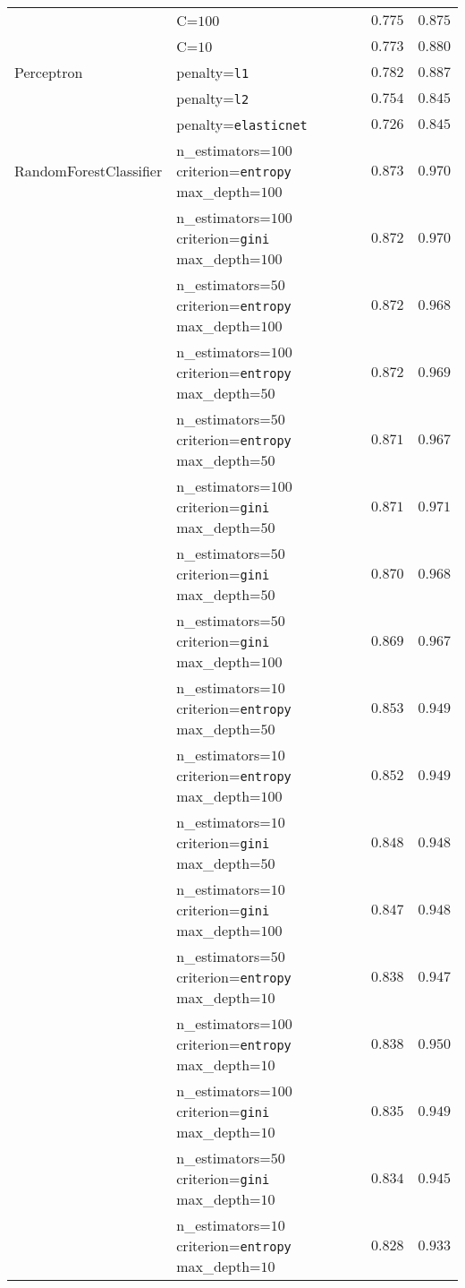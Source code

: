 \begin{longtable}{llrr}
& \tiny{C=$100$} &$0.775$ & $0.875$\\
& \tiny{C=$10$} &$0.773$ & $0.880$\\
\midrule
Perceptron & \tiny{penalty=\texttt{l1}} &$0.782$ & $0.887$\\
& \tiny{penalty=\texttt{l2}} &$0.754$ & $0.845$\\
& \tiny{penalty=\texttt{elasticnet}} &$0.726$ & $0.845$\\
\midrule
RandomForestClassifier & \tiny{n\_estimators=$100$ criterion=\texttt{entropy} max\_depth=$100$} &$0.873$ & $0.970$\\
& \tiny{n\_estimators=$100$ criterion=\texttt{gini} max\_depth=$100$} &$0.872$ & $0.970$\\
& \tiny{n\_estimators=$50$ criterion=\texttt{entropy} max\_depth=$100$} &$0.872$ & $0.968$\\
& \tiny{n\_estimators=$100$ criterion=\texttt{entropy} max\_depth=$50$} &$0.872$ & $0.969$\\
& \tiny{n\_estimators=$50$ criterion=\texttt{entropy} max\_depth=$50$} &$0.871$ & $0.967$\\
& \tiny{n\_estimators=$100$ criterion=\texttt{gini} max\_depth=$50$} &$0.871$ & $0.971$\\
& \tiny{n\_estimators=$50$ criterion=\texttt{gini} max\_depth=$50$} &$0.870$ & $0.968$\\
& \tiny{n\_estimators=$50$ criterion=\texttt{gini} max\_depth=$100$} &$0.869$ & $0.967$\\
& \tiny{n\_estimators=$10$ criterion=\texttt{entropy} max\_depth=$50$} &$0.853$ & $0.949$\\
& \tiny{n\_estimators=$10$ criterion=\texttt{entropy} max\_depth=$100$} &$0.852$ & $0.949$\\
& \tiny{n\_estimators=$10$ criterion=\texttt{gini} max\_depth=$50$} &$0.848$ & $0.948$\\
& \tiny{n\_estimators=$10$ criterion=\texttt{gini} max\_depth=$100$} &$0.847$ & $0.948$\\
& \tiny{n\_estimators=$50$ criterion=\texttt{entropy} max\_depth=$10$} &$0.838$ & $0.947$\\
& \tiny{n\_estimators=$100$ criterion=\texttt{entropy} max\_depth=$10$} &$0.838$ & $0.950$\\
& \tiny{n\_estimators=$100$ criterion=\texttt{gini} max\_depth=$10$} &$0.835$ & $0.949$\\
& \tiny{n\_estimators=$50$ criterion=\texttt{gini} max\_depth=$10$} &$0.834$ & $0.945$\\
& \tiny{n\_estimators=$10$ criterion=\texttt{entropy} max\_depth=$10$} &$0.828$ & $0.933$\\

\end{longtable}
